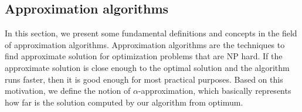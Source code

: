 % 
% 

\subsection{Approximation algorithms}
In this section, we present some fundamental definitions and concepts in the
field of approximation algorithms.
Approximation algorithms are the techniques to find approximate solution for optimization problems that are NP hard.
If the approximate solution is close enough to the optimal solution and the algorithm runs faster, then it is good enough for most practical purposes. 
Based on this motivation, we define the notion of $\alpha$-approximation, which basically represents how far is the solution computed by our algorithm from optimum.

